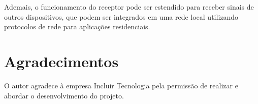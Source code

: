 \documentclass[10pt,a4paper]{article}
\begin{document}
\begin{multicols*}{2}
Ademais, o funcionamento do receptor pode ser estendido para receber sinais de outros dispositivos, que podem ser integrados em uma rede local utilizando protocolos de rede para aplicações residenciais.

\section*{Agradecimentos}
O autor agradece à empresa Incluir Tecnologia pela permissão de realizar e abordar o desenvolvimento do projeto.

\printbibliography

\end{multicols*}
\end{document}
